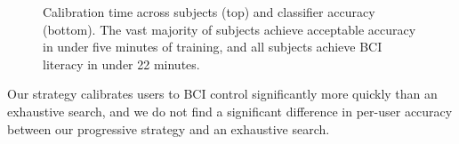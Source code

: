 \begin{figure}[!h]
  \vspace{-0.2cm}
  \centering

  
  \def\angle{0}
\def\radius{2.9}
\def\cyclelist{{"red","green","blue","yellow"}}
\newcount\cyclecount {}
\newcount\ind {}
  \vspace{0.1cm}
  
  \caption{Calibration time across subjects (top) and classifier accuracy (bottom). The vast majority of subjects achieve acceptable accuracy in under five minutes of training, and all subjects achieve BCI literacy in under 22 minutes. }
  \label{fig:calibration_results}
  \vspace{-0.1cm}
\end{figure}

Our strategy calibrates users to BCI control significantly more quickly than an exhaustive search, and we do not find a significant difference in per-user accuracy between our progressive strategy and an exhaustive search. 

